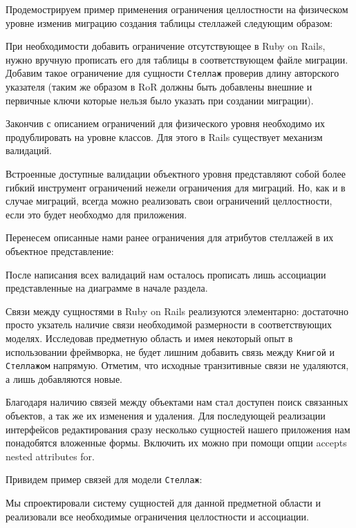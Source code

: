 Продемострируем пример применения ограничения целлостности на физическом уровне
изменив миграцию создания таблицы стеллажей следующим образом:
\begin{small}

\end{small}

При необходимости добавить ограничение отсутствующее в Ruby on Rails,
нужно вручную прописать его для
таблицы в соответствующем файле миграции. Добавим такое
ограничение для сущности \verb|Стеллаж|
проверив длину авторского указателя (таким же образом в RoR должны быть добавлены
внешние и первичные ключи которые нельзя было указать при создании миграции).
\begin{small}

\end{small}

Закончив с описанием ограничений для физического уровня необходимо их
продублировать на уровне классов. Для этого в Rails существует механизм
валидаций.

Встроенные доступные валидации объектного уровня представляют
собой более гибкий инструмент ограничений нежели ограничения
для миграций. Но, как и в случае миграций, всегда можно реализовать
свои ограничений целлостности, если это будет необходмо для приложения.

Перенесем описанные нами ранее ограничения для атрибутов стеллажей в их
объектное представление:
\begin{small}

\end{small}

После написания всех валидаций нам осталось прописать лишь ассоциации
представленные на диаграмме в начале раздела.

Связи между сущностями в Ruby on Rails реализуются элементарно: достаточно просто
укзатель наличие связи необходимой размерности в соответствующих моделях.
Исследовав предметную область и имея некоторый опыт в использовании фреймворка,
не будет лишним добавить связь между \verb|Книгой| и \verb|Стеллажом| напрямую.
Отметим, что исходные транзитивные связи не удаляются, а лишь добавляются новые.

Благодаря наличию связей между объектами нам стал доступен поиск связанных
объектов, а так же их изменения и удаления. Для последующей реализации интерфейсов
редактирования сразу несколько сущностей нашего приложения нам
понадобятся вложенные формы.
Включить их можно при помощи опции accepts nested attributes for.

Привидем пример связей для модели \verb|Стеллаж|:
\begin{small}

\end{small}

Мы спроектировали систему сущностей для данной предметной области и
реализовали все необходимые ограничения целлостности и ассоциации.
